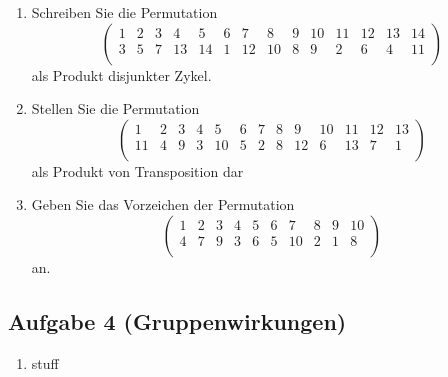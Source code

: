 \documentclass[11pt,a4paper,ngerman]{article}
\begin{document}
\begin{enumerate}[\bfseries a)]
\item Schreiben Sie die Permutation
$$
\left( \begin{array}{cccccccccccccc}
1 & 2 & 3 & 4 & 5 & 6 & 7 & 8 & 9 & 10 & 11 & 12 & 13 & 14  \\
3 & 5 & 7 & 13 & 14 & 1 & 12 & 10 & 8 & 9 & 2 & 6 & 4 & 11  \\
\end{array} \right)
$$
als Produkt disjunkter Zykel.

\item Stellen Sie die Permutation
$$
\left( \begin{array}{cccccccccccccc}
1 & 2 & 3 & 4 & 5 & 6 & 7 & 8 & 9 & 10 & 11 & 12 & 13  \\
11 & 4 & 9 & 3 & 10 & 5 & 2 & 8 & 12 & 6 & 13 & 7 & 1  \\
\end{array} \right)
$$
als Produkt von Transposition dar

\item Geben Sie das Vorzeichen der Permutation 
$$
\left( \begin{array}{cccccccccccccc}
1 & 2 & 3 & 4 & 5 & 6 & 7 & 8 & 9 & 10  \\
4 & 7 & 9 & 3 & 6 & 5 & 10 & 2 & 1 & 8  \\
\end{array} \right)
$$
an.

\end{enumerate}

\subsection*{Aufgabe 4 \mdseries (Gruppenwirkungen)}

\begin{enumerate}[\bfseries a)]
\item stuff
\end{enumerate}

\label{LastPage}
\end{document}
